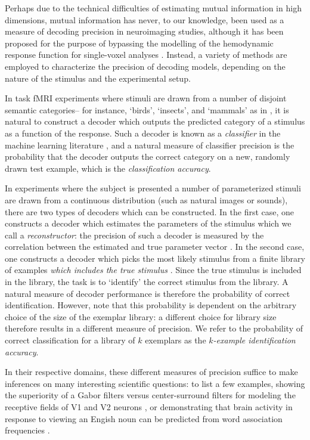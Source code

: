 \documentclass[12pt]{article}
\begin{document}
Perhaps due to the technical difficulties of estimating mutual
information in high dimensions, mutual information has never, to our
knowledge, been used as a measure of decoding precision in
neuroimaging studies, although it has been proposed for the purpose of
bypassing the modelling of the hemodynamic response function for
single-voxel analyses \cite{FuhrmannAlpert2007}.  Instead, a variety
of methods are employed to characterize the precision of decoding
models, depending on the nature of the stimulus and the experimental
setup.

In task fMRI experiments where stimuli are drawn from a number of
disjoint semantic categories-- for instance, `birds', `insects', and
`mammals' as in \cite{Connolly2012}, it is natural to construct a
decoder which outputs the predicted category of a stimulus as a
function of the response.  Such a decoder is known as
a \emph{classifier} in the machine learning
literature \cite{Hastie2009a}, and a natural measure of classifier
precision is the probability that the decoder outputs the correct
category on a new, randomly drawn test example, which is
the \emph{classification accuracy}.

In experiments where the subject is presented a number of
parameterized stimuli are drawn from a continuous distribution (such
as natural images or sounds), there are two types of decoders which
can be constructed.  In the first case, one constructs a decoder which
estimates the parameters of the stimulus which we call
a \emph{reconstructor}: the precision of such a decoder is measured by
the correlation between the estimated and true parameter vector
\cite{Pasley2012} \cite{Nishimoto2011}\cite{Naselaris2009}.
In the second case, one constructs a decoder which picks the most
likely stimulus from a finite library of examples \emph{which includes
the true stimulus} \cite{Kay2008a}\cite{Mitchell2008}.  Since the true
stimulus is included in the library, the task is to `identify' the
correct stimulus from the library.  A natural measure of decoder
performance is therefore the probability of correct identification.
However, note that this probability is dependent on the arbitrary
choice of the size of the exemplar library: a different choice for
library size therefore results in a different measure of precision.
We refer to the probability of correct classification for a library of
$k$ exemplars as the \emph{$k$-example identification accuracy}.

In their respective domains, these different measures of precision
suffice to make inferences on many interesting scientific questions:
to list a few examples, showing the superiority of a Gabor filters
versus center-surround filters for modeling the receptive fields of V1
and V2 neurons \cite{Kay2008a}, or demonstrating that brain activity
in response to viewing an Engish noun can be predicted from word
association frequencies \cite{Mitchell2008}.  
\end{document}
